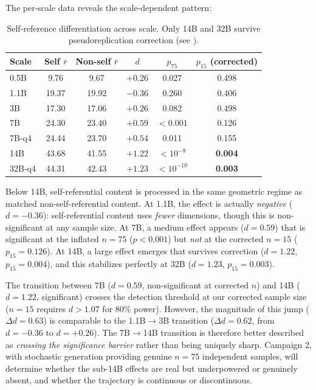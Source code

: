 \documentclass[11pt,a4paper]{article}
\begin{document}
The per-scale data reveals the scale-dependent pattern:

\begin{table}[H]
\centering
\caption{Self-reference differentiation across scale. Only 14B and 32B survive pseudoreplication correction (see ).}
\label{tab:self_ref_detail}
\begin{tabular}{lccccc}
\toprule
\textbf{Scale} & \textbf{Self $\bar{r}$} & \textbf{Non-self $\bar{r}$} & \textbf{$d$} & \textbf{$p_{75}$} & \textbf{$p_{15}$ (corrected)} \\
\midrule
0.5B & 9.76 & 9.67 & $+0.26$ & 0.027 & 0.498 \\
1.1B & 19.37 & 19.92 & $-0.36$ & 0.260 & 0.406 \\
3B & 17.30 & 17.06 & $+0.26$ & 0.082 & 0.498 \\
7B & 24.30 & 23.40 & $+0.59$ & $< 0.001$ & 0.126 \\
7B-q4 & 24.44 & 23.70 & $+0.54$ & 0.011 & 0.155 \\
14B & 43.68 & 41.55 & $+1.22$ & $< 10^{-8}$ & \textbf{0.004} \\
32B-q4 & 44.31 & 42.43 & $+1.23$ & $< 10^{-10}$ & \textbf{0.003} \\
\bottomrule
\end{tabular}
\end{table}

Below 14B, self-referential content is processed in the same geometric regime as matched non-self-referential content. At 1.1B, the effect is actually \emph{negative} ($d = -0.36$): self-referential content uses \emph{fewer} dimensions, though this is non-significant at any sample size. At 7B, a medium effect appears ($d = 0.59$) that is significant at the inflated $n = 75$ ($p < 0.001$) but \emph{not} at the corrected $n = 15$ ($p_{15} = 0.126$). At 14B, a large effect emerges that survives correction ($d = 1.22$, $p_{15} = 0.004$), and this stabilizes perfectly at 32B ($d = 1.23$, $p_{15} = 0.003$).

The transition between 7B ($d = 0.59$, non-significant at corrected $n$) and 14B ($d = 1.22$, significant) crosses the detection threshold at our corrected sample size ($n = 15$ requires $d > 1.07$ for 80\% power). However, the magnitude of this jump ($\Delta d = 0.63$) is comparable to the 1.1B$\to$3B transition ($\Delta d = 0.62$, from $d = -0.36$ to $d = +0.26$). The 7B$\to$14B transition is therefore better described as \emph{crossing the significance barrier} rather than being uniquely sharp. Campaign 2, with stochastic generation providing genuine $n = 75$ independent samples, will determine whether the sub-14B effects are real but underpowered or genuinely absent, and whether the trajectory is continuous or discontinuous.
\end{document}
